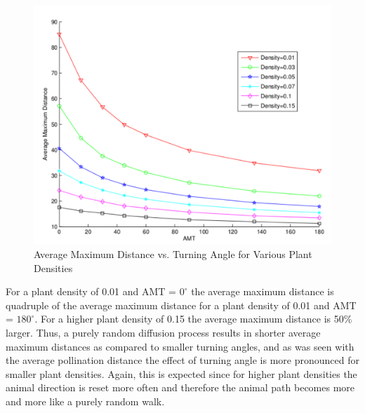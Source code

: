 \begin{figure}
  \begin{center}
  \includegraphics[scale=0.5]{MaxDVsAMT.pdf}
  \end{center}
  \caption{\small Average Maximum Distance vs. Turning Angle for Various Plant Densities}
  \label{AvgMaxDBees}
\end{figure}

For a plant density of 0.01 and AMT = $0^\circ$ the average maximum distance is
quadruple of the average maximum distance for a plant density of 0.01 and AMT =
$180^\circ$. For a higher plant density of 0.15 the average maximum distance is
50\% larger. Thus, a purely random diffusion process results in shorter average
maximum distances as compared to smaller turning angles, and as was seen with
the average pollination distance the effect of turning angle is more pronounced
for smaller plant densities. Again, this is expected since for higher plant
densities the animal direction is reset more often and therefore the animal path
becomes more and more like a purely random walk.

